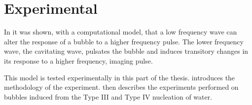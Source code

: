 


\part{Experimental}\label{part:experimental}

\begin{quote}

\end{quote}



In  it was shown, with a computational model,
that a low frequency wave can alter the response of a bubble to a higher frequency pulse.
The lower frequency wave, the cavitating wave,
pulsates the bubble and induces transitory changes in its response to a higher frequency, imaging pulse.

This model is tested experimentally in this part of the thesis.
 introduces the methodology of the experiment.
then describes the experiments performed on %
bubbles induced from the Type III and Type IV nucleation  of water.


